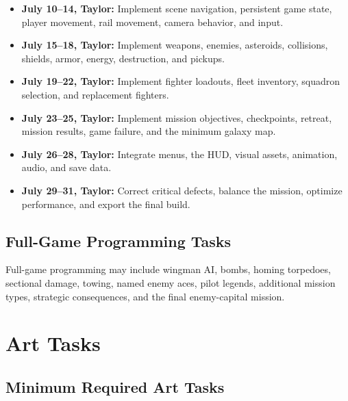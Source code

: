 \documentclass[journal]{IEEEtran}
\begin{document}
\begin{itemize}

    \item \textbf{July 10--14, Taylor:}
    Implement scene navigation, persistent game state, player movement, rail movement, camera behavior, and input.

    \item \textbf{July 15--18, Taylor:}
    Implement weapons, enemies, asteroids, collisions, shields, armor, energy,  destruction, and pickups.

    \item \textbf{July 19--22, Taylor:}
    Implement fighter loadouts, fleet inventory, squadron selection, and replacement fighters.

    \item \textbf{July 23--25, Taylor:}
    Implement mission objectives, checkpoints, retreat, mission results, game failure, and the minimum galaxy map.

    \item \textbf{July 26--28, Taylor:}
    Integrate menus, the HUD, visual assets, animation, audio, and save data.

    \item \textbf{July 29--31, Taylor:}
    Correct critical defects, balance the mission, optimize performance, and export the final build.

\end{itemize}


\subsection{Full-Game Programming Tasks}

Full-game programming may include wingman AI, bombs, homing torpedoes, sectional damage, towing, named enemy aces, pilot legends, additional mission types, strategic consequences, and the final enemy-capital mission. 


\section{Art Tasks}

\subsection{Minimum Required Art Tasks}
\end{document}
